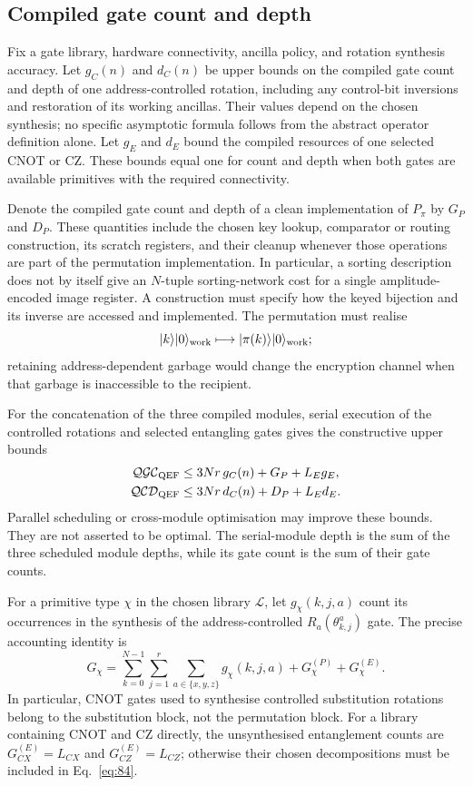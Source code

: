 {\subsection{Compiled gate count and depth}

Fix a gate library, hardware connectivity, ancilla policy, and rotation
synthesis accuracy. Let $g_C(n)$ and $d_C(n)$ be upper bounds on the
compiled gate count and depth of one address-controlled rotation,
including any control-bit inversions and restoration of its working
ancillas. Their values depend on the chosen synthesis; no specific
asymptotic formula follows from the abstract operator definition alone.
Let $g_E$ and $d_E$ bound the compiled resources of one selected CNOT
or CZ. These bounds equal one for count and depth when both gates are
available primitives with the required connectivity.

Denote the compiled gate count and depth of a clean implementation of
$P_\pi$ by $G_P$ and $D_P$. These quantities include the chosen key
lookup, comparator or routing construction, its scratch registers,
and their cleanup whenever those operations are part of the
permutation implementation. In particular, a sorting description does
not by itself give an $N$-tuple sorting-network cost for a single
amplitude-encoded image register. A construction must specify how the
keyed bijection and its inverse are accessed and implemented. The
permutation must realise
\[
|k\rangle|0\rangle_{\rm work}
\longmapsto
|\pi(k)\rangle|0\rangle_{\rm work};
\]
retaining address-dependent garbage would change the encryption
channel when that garbage is inaccessible to the recipient.

For the concatenation of the three compiled modules, serial execution
of the controlled rotations and selected entangling gates gives the
constructive upper bounds
\begin{align}
\mathcal{QGC}_{\rm QEF}
&\le 3Nr\,g_C(n)+G_P+L_Eg_E,
\label{eq:qef-compiled-gate-bound}\\
\mathcal{QCD}_{\rm QEF}
&\le 3Nr\,d_C(n)+D_P+L_Ed_E.
\label{eq:qef-compiled-depth-bound}
\end{align}
Parallel scheduling or cross-module optimisation may improve these
bounds. They are not asserted to be optimal. The serial-module depth
is the sum of the three scheduled module depths, while its gate count
is the sum of their gate counts.

For a primitive type $\chi$ in the chosen library $\mathcal L$, let
$g_\chi(k,j,a)$ count its occurrences in the synthesis of the
address-controlled $R_a(\theta_{k,j}^a)$ gate. The precise accounting
identity is
\begin{equation}
G_\chi=
\sum_{k=0}^{N-1}\sum_{j=1}^{r}\sum_{a\in\{x,y,z\}}
g_\chi(k,j,a)+G_\chi^{(P)}+G_\chi^{(E)}.
\label{eq:84}
\end{equation}
In particular, CNOT gates used to synthesise controlled substitution
rotations belong to the substitution block, not the permutation block.
For a library containing CNOT and CZ directly, the unsynthesised
entanglement counts are $G_{CX}^{(E)}=L_{CX}$ and
$G_{CZ}^{(E)}=L_{CZ}$; otherwise their chosen decompositions must be
included in Eq.~\eqref{eq:84}.

}
